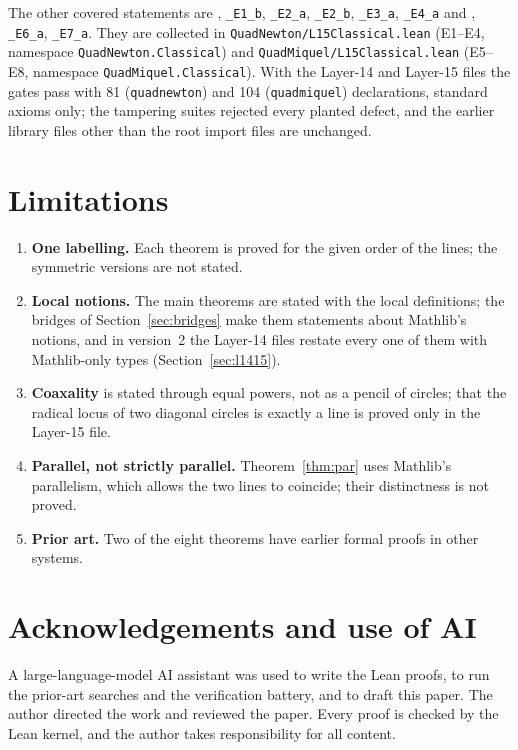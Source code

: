 \documentclass[11pt]{article}
\theoremstyle{definition}
\theoremstyle{remark}
\newcommand{\lean}[1]{\texttt{#1}}
\begin{document}
The other covered statements are , \lean{\_E1\_b}, \lean{\_E2\_a},
\lean{\_E2\_b}, \lean{\_E3\_a}, \lean{\_E4\_a} and , \lean{\_E6\_a},
\lean{\_E7\_a}. They are collected in \lean{QuadNewton/L15Classical.lean} (E1--E4, namespace
\lean{QuadNewton.Classical}) and \lean{QuadMiquel/L15Classical.lean} (E5--E8, namespace
\lean{QuadMiquel.Classical}). With the Layer-14 and Layer-15 files the gates pass with 81
(\lean{quadnewton}) and 104 (\lean{quadmiquel}) declarations, standard axioms only; the tampering suites
rejected every planted defect, and the earlier library files other than the root import files are
unchanged.

\section{Limitations}\label{sec:limits}
\begin{enumerate}
\item \textbf{One labelling.} Each theorem is proved for the given order of the lines; the symmetric
versions are not stated.
\item \textbf{Local notions.} The main theorems are stated with the local definitions; the bridges of
Section~\ref{sec:bridges} make them statements about Mathlib's notions, and in version~2 the Layer-14
files restate every one of them with Mathlib-only types (Section~\ref{sec:l1415}).
\item \textbf{Coaxality} is stated through equal powers, not as a pencil of circles; that the radical
locus of two diagonal circles is exactly a line is proved only in the Layer-15 file.
\item \textbf{Parallel, not strictly parallel.} Theorem~\ref{thm:par} uses Mathlib's parallelism,
which allows the two lines to coincide; their distinctness is not proved.
\item \textbf{Prior art.} Two of the eight theorems have earlier formal proofs in other systems.
\end{enumerate}

\section*{Acknowledgements and use of AI}
A large-language-model AI assistant was used to write the Lean proofs, to run the prior-art searches
and the verification battery, and to draft this paper. The author directed the work and reviewed the
paper. Every proof is checked by the Lean kernel, and the author takes responsibility for all content.
\end{document}
